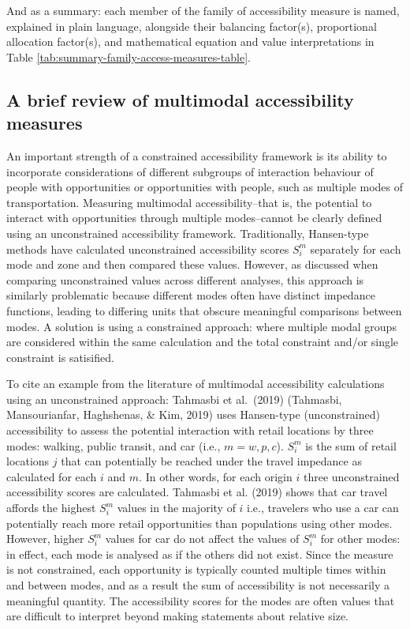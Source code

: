 \documentclass[
11pt, %
oneside, %
english, %
singlespacing, %
]{macthesis} %
\begin{document}
And as a summary: each member of the family of accessibility measure is named, explained in plain language, alongside their balancing factor(s), proportional allocation factor(s), and mathematical equation and value interpretations in Table \ref{tab:summary-family-access-measures-table}.



\subsection{A brief review of multimodal accessibility measures}\label{a-brief-review-of-multimodal-accessibility-measures}

An important strength of a constrained accessibility framework is its ability to incorporate considerations of different subgroups of interaction behaviour of people with opportunities or opportunities with people, such as multiple modes of transportation. Measuring multimodal accessibility--that is, the potential to interact with opportunities through multiple modes--cannot be clearly defined using an unconstrained accessibility framework. Traditionally, Hansen-type methods have calculated unconstrained accessibility scores \(S_i^m\) separately for each mode and zone and then compared these values. However, as discussed when comparing unconstrained values across different analyses, this approach is similarly problematic because different modes often have distinct impedance functions, leading to differing units that obscure meaningful comparisons between modes. A solution is using a constrained approach: where multiple modal groups are considered within the same calculation and the total constraint and/or single constraint is satisified.

To cite an example from the literature of multimodal accessibility calculations using an unconstrained approach: Tahmasbi et al.~(2019) (Tahmasbi, Mansourianfar, Haghshenas, \& Kim, 2019) uses Hansen-type (unconstrained) accessibility to assess the potential interaction with retail locations by three modes: walking, public transit, and car (i.e., \(m = w, p, c\)). \(S_i^m\) is the sum of retail locations \(j\) that can potentially be reached under the travel impedance as calculated for each \(i\) and \(m\). In other words, for each origin \(i\) three unconstrained accessibility scores are calculated. Tahmasbi et al. (2019) shows that car travel affords the highest \(S_i^{m}\) values in the majority of \(i\) i.e., travelers who use a car can potentially reach more retail opportunities than populations using other modes. However, higher \(S_i^{m}\) values for car do not affect the values of \(S_i^{m}\) for other modes: in effect, each mode is analysed as if the others did not exist. Since the measure is not constrained, each opportunity is typically counted multiple times within and between modes, and as a result the sum of accessibility is not necessarily a meaningful quantity. The accessibility scores for the modes are often values that are difficult to interpret beyond making statements about relative size.
\end{document}
